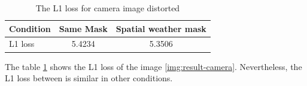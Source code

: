 \begin{table}
    \centering
    \begin{tabular}{l c c}
        \hline
        Condition  & Same Mask    & Spatial weather mask \\
        \hline
        L1 loss & 5.4234 & 5.3506 \\
        \hline
    \end{tabular}
    \caption{The L1 loss for camera image distorted}
    \label{table:result-l1}
\end{table}
The table \ref{table:result-l1} shows the L1 loss of the image \ref{img:result-camera}. Nevertheless, the L1 loss between is similar in other conditions.